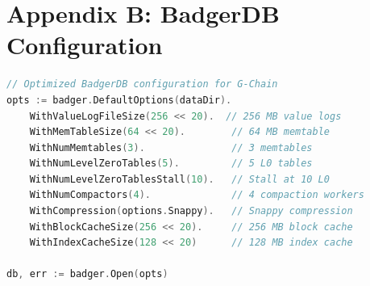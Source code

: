 \section{Appendix B: BadgerDB Configuration}


\begin{lstlisting}[language=Go, basicstyle=\footnotesize\ttfamily]
// Optimized BadgerDB configuration for G-Chain
opts := badger.DefaultOptions(dataDir).
    WithValueLogFileSize(256 << 20).  // 256 MB value logs
    WithMemTableSize(64 << 20).        // 64 MB memtable
    WithNumMemtables(3).               // 3 memtables
    WithNumLevelZeroTables(5).         // 5 L0 tables
    WithNumLevelZeroTablesStall(10).   // Stall at 10 L0
    WithNumCompactors(4).              // 4 compaction workers
    WithCompression(options.Snappy).   // Snappy compression
    WithBlockCacheSize(256 << 20).     // 256 MB block cache
    WithIndexCacheSize(128 << 20)      // 128 MB index cache

db, err := badger.Open(opts)
\end{lstlisting}

